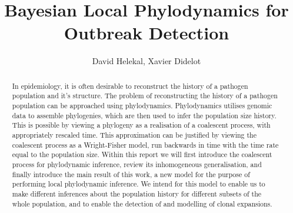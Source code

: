 \documentclass{ieeeaccess}
\theoremstyle{definition}
\begin{document}
\title{Bayesian Local Phylodynamics for Outbreak Detection}
\author{David Helekal, Xavier Didelot}
\begin{abstract}
In epidemiology, it is often desirable to reconstruct the history of a pathogen population and it's structure. The problem of reconstructing the history of a pathogen population can be approached using phylodynamics. Phylodynamics utilises genomic data to assemble phylogenies, which are then used to infer the population size history. This is possible by viewing a phylogeny as a realisation of a coalescent process, with appropriately rescaled time. This approximation can be justified by viewing the coalescent process as a Wright-Fisher model, run backwards in time with the time rate equal to the population size. Within this report we will first introduce the coalescent process for phylodynamic inference, review its inhomogeneous generalisation, and finally introduce the main result of this work, a new model for the purpose of performing local phylodynamic inference. We intend for this model to enable us to make different inferences about the population history for different subsets of the whole population, and to enable the detection of and modelling of clonal expansions.
\end{abstract}
\titlepgskip=-15pt

\maketitle
\end{document}
